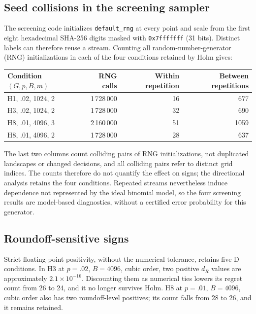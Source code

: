 \subsection{Seed collisions in the screening sampler}\label{app:collisions}
The screening code initializes \texttt{default\_rng} at every point and scale from the first eight hexadecimal SHA-256 digits masked with \texttt{0x7fffffff} (31 bits). Distinct labels can therefore reuse a stream. Counting all random-number-generator (RNG) initializations in each of the four conditions retained by Holm gives:
\begin{center}\small
\begin{tabular}{lrrr}\hline
Condition $(G,p,B,m)$ & RNG calls & Within repetition & Between repetitions\\\hline
H1, .02, 1024, 2 & 1\,728\,000 & 16 & 677\\
H3, .02, 1024, 2 & 1\,728\,000 & 32 & 690\\
H8, .01, 4096, 3 & 2\,160\,000 & 51 & 1059\\
H8, .01, 4096, 2 & 1\,728\,000 & 28 & 637\\\hline
\end{tabular}
\end{center}
The last two columns count colliding pairs of RNG initializations, not duplicated landscapes or changed decisions, and all colliding pairs refer to distinct grid indices. The counts therefore do not quantify the effect on signs; the directional analysis retains the four conditions. Repeated streams nevertheless induce dependence not represented by the ideal binomial model, so the four screening results are model-based diagnostics, without a certified error probability for this generator.

\subsection{Roundoff-sensitive signs}
Strict floating-point positivity, without the numerical tolerance, retains five D conditions. In H3 at $p=.02$, $B=4096$, cubic order, two positive $d_R$ values are approximately $2.1\times10^{-16}$. Discounting them as numerical ties lowers its regret count from 26 to 24, and it no longer survives Holm. H8 at $p=.01$, $B=4096$, cubic order also has two roundoff-level positives; its count falls from 28 to 26, and it remains retained.

